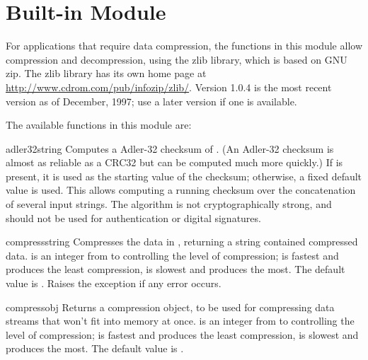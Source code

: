 
\section{Built-in Module }
\label{module-zlib}

For applications that require data compression, the functions in this
module allow compression and decompression, using the zlib library,
which is based on GNU zip.  The zlib library has its own home page at
\url{http://www.cdrom.com/pub/infozip/zlib/}.
Version 1.0.4 is the most recent version as of December, 1997; use a
later version if one is available.

The available functions in this module are:

\begin{funcdesc}{adler32}{string}
   Computes a Adler-32 checksum of .  (An Adler-32
   checksum is almost as reliable as a CRC32 but can be computed much
   more quickly.)  If  is present, it is used as the
   starting value of the checksum; otherwise, a fixed default value is
   used.  This allows computing a running checksum over the
   concatenation of several input strings.  The algorithm is not
   cryptographically strong, and should not be used for
   authentication or digital signatures.
\end{funcdesc}

\begin{funcdesc}{compress}{string}
Compresses the data in , returning a string contained
compressed data.   is an integer from  to 
controlling the level of compression;  is fastest and produces
the least compression,  is slowest and produces the most.  The
default value is .  Raises the 
exception if any error occurs.
\end{funcdesc}

\begin{funcdesc}{compressobj}{}
  Returns a compression object, to be used for compressing data streams
  that won't fit into memory at once.   is an integer from
   to  controlling the level of compression;  is
  fastest and produces the least compression,  is slowest and
  produces the most.  The default value is .
\end{funcdesc}

